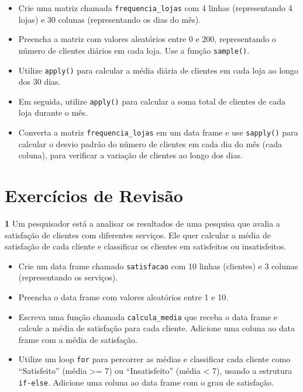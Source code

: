 \documentclass[
]{book}
\providecommand{\tightlist}{%
  \setlength{\itemsep}{0pt}\setlength{\parskip}{0pt}}
\begin{document}
\begin{itemize}
\tightlist
\item
  Crie uma matriz chamada \texttt{frequencia\_lojas} com 4 linhas (representando 4 lojas) e 30 colunas (representando os dias do mês).
\item
  Preencha a matriz com valores aleatórios entre 0 e 200, representando o número de clientes diários em cada loja. Use a função \texttt{sample()}.
\item
  Utilize \texttt{apply()} para calcular a média diária de clientes em cada loja ao longo dos 30 dias.
\item
  Em seguida, utilize \texttt{apply()} para calcular a soma total de clientes de cada loja durante o mês.
\item
  Converta a matriz \texttt{frequencia\_lojas} em um data frame e use \texttt{sapply()} para calcular o desvio padrão do número de clientes em cada dia do mês (cada coluna), para verificar a variação de clientes ao longo dos dias.
\end{itemize}

\chapter{Exercícios de Revisão}\label{exercuxedcios-de-revisuxe3o}

\textbf{1} Um pesquisador está a analisar os resultados de uma pesquisa que avalia a satisfação de clientes com diferentes serviços. Ele quer calcular a média de satisfação de cada cliente e classificar os clientes em satisfeitos ou insatisfeitos.

\begin{itemize}
\tightlist
\item
  Crie um data frame chamado \texttt{satisfacao} com 10 linhas (clientes) e 3 colunas (representando os serviços).
\item
  Preencha o data frame com valores aleatórios entre 1 e 10.
\item
  Escreva uma função chamada \texttt{calcula\_media} que receba o data frame e calcule a média de satisfação para cada cliente. Adicione uma coluna ao data frame com a média de satisfação.
\item
  Utilize um loop \texttt{for} para percorrer as médias e classificar cada cliente como ``Satisfeito'' (média \textgreater= 7) ou ``Insatisfeito'' (média \textless{} 7), usando a estrutura \texttt{if-else}. Adicione uma coluna ao data frame com o grau de satisfação.
\end{itemize}
\end{document}

